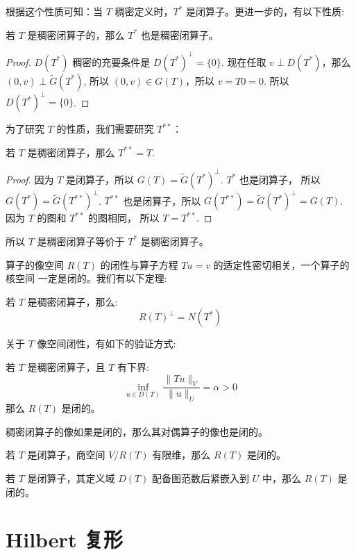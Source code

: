 \documentclass[lang=cn,a4paper,newtx]{elegantpaper}
\begin{document}
根据这个性质可知：当 $T$ 稠密定义时，$T^*$ 是闭算子。更进一步的，有以下性质:
\begin{property}
    若 $T$ 是稠密闭算子的，那么 $T^*$ 也是稠密闭算子。
\end{property}
\begin{proof}
    $D(T^*)$ 稠密的充要条件是 $D(T^*)^{\perp} = \{0\}$.
    现在任取 $v \perp D(T^*)$，那么 $(0, v) \perp \tilde{G}(T^*)$, 所以
    $(0, v) \in G(T)$，所以 $v = T0 = 0$.
    所以 $D(T^*)^{\perp} = \{0\}$.
\end{proof}
为了研究 $T$ 的性质，我们需要研究 $T^{**}$：
\begin{property}
    若 $T$ 是稠密闭算子，那么 $T^{**} = T$.
\end{property}
\begin{proof}
    因为 $T$ 是闭算子，所以 $G(T) = \tilde{G}(T^*)^{\perp}$. $T^*$ 也是闭算子，
    所以 $G(T^*) = \tilde{G}(T^{**})^{\perp}$. $T^{**}$ 也是闭算子，所以
    $G(T^{**}) = \tilde{G}(T^{*})^{\perp} = G(T)$. 因为 $T$ 的图和 $T^{**}$ 的图相同，
    所以 $T = T^{**}$.
\end{proof}
所以 $T$ 是稠密闭算子等价于 $T^*$ 是稠密闭算子。

算子的像空间 $R(T)$ 的闭性与算子方程 $Tu = v$ 的适定性密切相关，一个算子的核空间 
一定是闭的。我们有以下定理:
\begin{theorem}
    \label{theorem:range_perp}
    若 $T$ 是稠密闭算子，那么:
    $$
    R(T)^{\perp} = N(T^*)
    $$
\end{theorem}
关于 $T$ 像空间闭性，有如下的验证方式:
\begin{theorem}
    若 $T$ 是稠密闭算子，且 $T$ 有下界:
    $$
    \inf_{u \in D(T)} \frac{\|Tu\|_V}{\|u\|_U} = \alpha > 0 
    $$
    那么 $R(T)$ 是闭的。
\end{theorem}
\begin{theorem}
    稠密闭算子的像如果是闭的，那么其对偶算子的像也是闭的。
\end{theorem}

\begin{theorem}
    \label{theorem:finite_dimensional_quotient_space}
    若 $T$ 是闭算子，商空间 $V/R(T)$ 有限维，那么 $R(T)$ 是闭的。
\end{theorem}

\begin{theorem}
    \label{theorem:compact_embedding}
    若 $T$ 是闭算子，其定义域 $D(T)$ 配备图范数后紧嵌入到 $U$ 中，那么 $R(T)$ 是闭的。
\end{theorem}

\section{Hilbert 复形}
\end{document}
